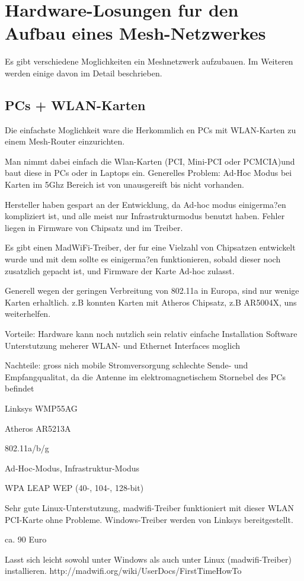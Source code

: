 \section{Hardware-Losungen fur den Aufbau eines Mesh-Netzwerkes}


Es gibt verschiedene Moglichkeiten ein Meshnetzwerk aufzubauen. Im Weiteren werden einige davon im Detail beschrieben. 

\subsection{PCs + WLAN-Karten}

Die einfachste Moglichkeit ware die Herkommlich en PCs mit WLAN-Karten zu einem Mesh-Router einzurichten. 

Man nimmt dabei einfach die Wlan-Karten (PCI, Mini-PCI oder PCMCIA)und baut diese in PCs oder in Laptops ein. 
Generelles Problem: 
 Ad-Hoc Modus bei Karten im 5Ghz Bereich ist von unausgereift bis nicht vorhanden. 

Hersteller haben gespart an der Entwicklung, da Ad-hoc modus einigerma?en kompliziert ist, und alle meist nur Infrastrukturmodus benutzt haben. Fehler liegen in Firmware von Chipsatz und im Treiber. 

Es gibt einen MadWiFi-Treiber, der fur eine Vielzahl von Chipsatzen entwickelt wurde und mit dem sollte es einigerma?en funktionieren, sobald dieser noch zusatzlich gepacht ist, und Firmware der Karte Ad-hoc zulasst. 

Generell wegen der geringen Verbreitung von 802.11a in Europa, sind nur wenige Karten erhaltlich. z.B konnten Karten mit Atheros Chipsatz, z.B AR5004X, uns weiterhelfen. 

Vorteile: 
Hardware kann noch nutzlich sein 
relativ einfache Installation 
Software Unterstutzung 
meherer WLAN- und Ethernet Interfaces moglich 

Nachteile: 
gross 
nich mobile 
Stromversorgung 
schlechte Sende- und Empfangqualitat, da die Antenne im elektromagnetischem Stornebel des PCs befindet 

\begin{wlandevice}{Linksys WMP55AG}

\chipset
Atheros AR5213A

\ieeestandard
802.11a/b/g

\mode
Ad-Hoc-Modus, Infrastruktur-Modus

\security
 WPA
 LEAP
 WEP (40-, 104-, 128-bit)

\driver
 Sehr gute Linux-Unterstutzung, madwifi-Treiber funktioniert
 mit dieser WLAN PCI-Karte ohne Probleme.
 Windows-Treiber werden von Linksys bereitgestellt.

\price
 ca. 90 Euro

\install
 Lasst sich leicht sowohl unter Windows als auch unter Linux (madwifi-Treiber) installieren.
 http://madwifi.org/wiki/UserDocs/FirstTimeHowTo

 \end{wlandevice}
